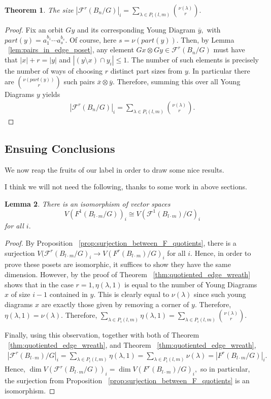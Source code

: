\documentclass{amsart}
\newtheorem{thm}{Theorem}[subsection]
\newtheorem{lem}[thm]{Lemma}
\theoremstyle{remark}
\newcommand\ssec{\subsection}
\begin{document}
\begin{thm}
\label{thm:edge_of_quotiented_wreath}
The size $|\mathcal F^r(B_n/G)|_i = \sum_{\lambda \in P_i(l,m)} \binom{\nu(\lambda)} r.$
\end{thm}
\begin{proof}
Fix an orbit $Gy$ and its corresponding Young Diagram $\overline{y},$ with $part(y) = a_1^{b_1}\cdots a_s^{b_s}.$ Of course, here $s = \nu(part(y)).$ Then, by Lemma ~\ref{lem:pairs_in_edge_poset}, any element $Gx \otimes Gy \in \mathcal F^r(B_n/G)$ must have that $|x| +r = |y|$ and $|(y \setminus x)\cap y_i| \leq 1.$ The number of such elements is precisely the number of ways of choosing $r$ distinct part sizes from $y.$ In particular there are $\binom{\nu(part(y))} r$ such pairs $\overline{x} \otimes \overline{y}.$ Therefore, summing this over all Young Diagrams $y$ yields
\begin{align*}
|\mathcal F^r(B_n/G)|_i = \sum_{\lambda \in P_i(l,m)} \binom{\nu(\lambda)} r.
\end{align*}
\end{proof}
\fi
\ssec{Ensuing Conclusions}
We now reap the fruits of our label in order to draw some nice results.

\iffalse
I think we will not need the following, thanks to some work in above sections.
\begin{lem}
\label{lem:wreath_1_isom}
There is an isomorphism of vector spaces $$V(F^1(B_{l\cdot m}/G))_i \cong V(\mathcal F^1(B_{l\cdot m})/G)_i$$ for all $i.$
\end{lem}
\begin{proof}
By Proposition ~\ref{prop:surjection_between_F_quotients}, there is a surjection $V(\mathcal F^r(B_{l\cdot m}/G)_i \rightarrow V(F^r(B_{l\cdot m})/G)_i$ for all $i.$ Hence, in order to prove these posets are isomorphic, it suffices to show they have the same dimension. However, by the proof of Theorem ~\ref{thm:quotiented_edge_wreath} shows that in the case $r = 1,\eta(\lambda,1)$ is equal to the number of Young Diagrams $x$ of size $i-1$ contained in $y.$ This is clearly equal to $\nu(\lambda)$ since such young diagrams $x$ are exactly those given by removing a corner of $y.$ Therefore, $\eta(\lambda,1) = \nu(\lambda).$ Therefore, $\sum_{\lambda \in P_i(l,m)} \eta(\lambda,1) = \sum_{\lambda \in P_i(l,m)} \binom{\nu(\lambda)} r.$

Finally, using this observation, together with both of Theorem ~\ref{thm:quotiented_edge_wreath}, and Theorem ~\ref{thm:quotiented_edge_wreath}, 
\begin{align*}
|\mathcal F^r(B_{l\cdot m})/G|_i =\sum_{\lambda \in P_i(l,m)} \eta(\lambda,1) = \sum_{\lambda \in P_i(l,m)}\nu(\lambda) = |F^r(B_{l\cdot m}/G)|_i.
\end{align*}
Hence,  $\dim V(\mathcal F^r(B_{l\cdot m}/G))_i = \dim V(F^r(B_{l\cdot m})/G)_i,$ so in particular, the surjection from Proposition ~\ref{prop:surjection_between_F_quotients} is an isomorphism.
\end{proof}
\end{document}
